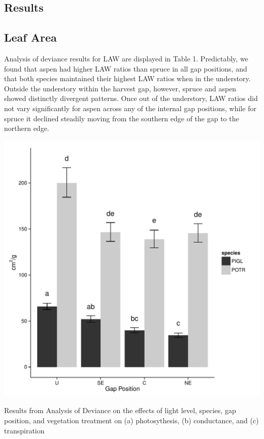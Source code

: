 \documentclass{article}\usepackage[]{graphicx}\usepackage[]{color}
\makeatletter
\def\maxwidth{ %
  \ifdim\Gin@nat@width>\linewidth
    \linewidth
  \else
    \Gin@nat@width
  \fi
}
\newenvironment{knitrout}{}{} %
\makeatother
\begin{document}
\begin{multicols}{2}

\section{Results}

\subsection{Leaf Area}

Analysis of deviance results for LAW are displayed in Table 1. Predictably, we found that aspen had higher LAW ratios than spruce in all gap positions, and that both species maintained their highest LAW ratios when in the understory. Outside the understory within the harvest gap, however, spruce and aspen showed distinctly divergent patterns. Once out of the understory, LAW ratios did not vary significantly for aspen across any of the internal gap positions, while for spruce it declined steadily moving from the southern edge of the gap to the northern edge.

\begin{knitrout}
\color{fgcolor}
\includegraphics[width=\maxwidth]{figure/la_plot} 

\end{knitrout}




\end{multicols}
\begin{table}[t] %
\centering
\subfloat[]{\scalebox{.6}{}}\quad
\subfloat[]{\scalebox{.6}{}}\quad
\subfloat[]{\scalebox{.6}{}}
\caption{Results from Analysis of Deviance on the effects of light level, species, gap position, and vegetation treatment on (a) photosythesis, (b) conductance, and (c) transpiration}
\end{table}
\end{document}

